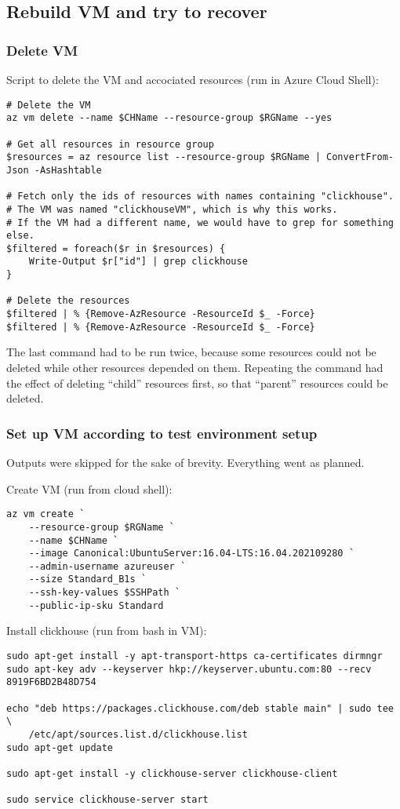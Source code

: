 \subsection{Rebuild VM and try to recover}
\label{sec:orgeb16138}
\subsubsection{Delete VM}
\label{sec:orga4a9443}
Script to delete the VM and accociated resources (run in Azure Cloud Shell):
\begin{verbatim}
# Delete the VM
az vm delete --name $CHName --resource-group $RGName --yes

# Get all resources in resource group
$resources = az resource list --resource-group $RGName | ConvertFrom-Json -AsHashtable

# Fetch only the ids of resources with names containing "clickhouse".
# The VM was named "clickhouseVM", which is why this works.
# If the VM had a different name, we would have to grep for something else.
$filtered = foreach($r in $resources) {
    Write-Output $r["id"] | grep clickhouse
}

# Delete the resources
$filtered | % {Remove-AzResource -ResourceId $_ -Force}
$filtered | % {Remove-AzResource -ResourceId $_ -Force}
\end{verbatim}

The last command had to be run twice,
because some resources could not be deleted while other resources depended on them.
Repeating the command had the effect of deleting ``child'' resources first,
so that ``parent'' resources could be deleted.

\subsubsection{Set up VM according to test environment setup}
\label{sec:orge14ae6f}
Outputs were skipped for the sake of brevity.
Everything went as planned.

Create VM (run from cloud shell):
\begin{verbatim}
az vm create `
    --resource-group $RGName `
    --name $CHName `
    --image Canonical:UbuntuServer:16.04-LTS:16.04.202109280 `
    --admin-username azureuser `
    --size Standard_B1s `
    --ssh-key-values $SSHPath `
    --public-ip-sku Standard
\end{verbatim}

Install clickhouse (run from bash in VM):
\begin{verbatim}
sudo apt-get install -y apt-transport-https ca-certificates dirmngr
sudo apt-key adv --keyserver hkp://keyserver.ubuntu.com:80 --recv 8919F6BD2B48D754

echo "deb https://packages.clickhouse.com/deb stable main" | sudo tee \
    /etc/apt/sources.list.d/clickhouse.list
sudo apt-get update

sudo apt-get install -y clickhouse-server clickhouse-client

sudo service clickhouse-server start
\end{verbatim}


